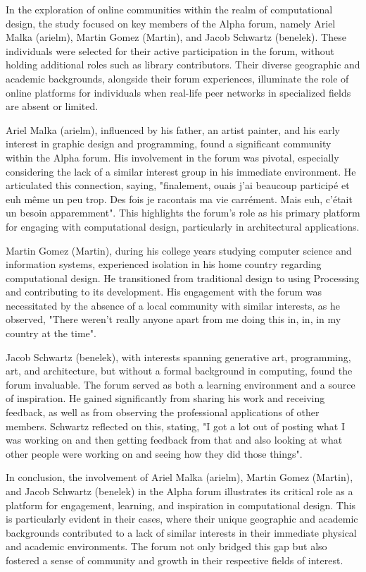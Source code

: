 In the exploration of online communities within the realm of computational design, the study focused on key members of the Alpha forum, namely Ariel Malka (arielm), Martin Gomez (Martin), and Jacob Schwartz (benelek). These individuals were selected for their active participation in the forum, without holding additional roles such as library contributors. Their diverse geographic and academic backgrounds, alongside their forum experiences, illuminate the role of online platforms for individuals when real-life peer networks in specialized fields are absent or limited.

Ariel Malka (arielm), influenced by his father, an artist painter, and his early interest in graphic design and programming, found a significant community within the Alpha forum. His involvement in the forum was pivotal, especially considering the lack of a similar interest group in his immediate environment. He articulated this connection, saying, "finalement, ouais j'ai beaucoup participé et euh même un peu trop. Des fois je racontais ma vie carrément. Mais euh, c'était un besoin apparemment"​​. This highlights the forum's role as his primary platform for engaging with computational design, particularly in architectural applications.

Martin Gomez (Martin), during his college years studying computer science and information systems, experienced isolation in his home country regarding computational design. He transitioned from traditional design to using Processing and contributing to its development. His engagement with the forum was necessitated by the absence of a local community with similar interests, as he observed, "There weren't really anyone apart from me doing this in, in, in my country at the time"​​.

Jacob Schwartz (benelek), with interests spanning generative art, programming, art, and architecture, but without a formal background in computing, found the forum invaluable. The forum served as both a learning environment and a source of inspiration. He gained significantly from sharing his work and receiving feedback, as well as from observing the professional applications of other members. Schwartz reflected on this, stating, "I got a lot out of posting what I was working on and then getting feedback from that and also looking at what other people were working on and seeing how they did those things"​​.

In conclusion, the involvement of Ariel Malka (arielm), Martin Gomez (Martin), and Jacob Schwartz (benelek) in the Alpha forum illustrates its critical role as a platform for engagement, learning, and inspiration in computational design. This is particularly evident in their cases, where their unique geographic and academic backgrounds contributed to a lack of similar interests in their immediate physical and academic environments. The forum not only bridged this gap but also fostered a sense of community and growth in their respective fields of interest.


